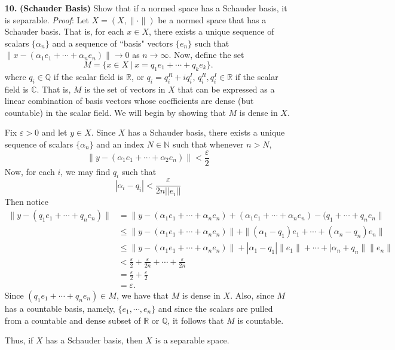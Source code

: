 \documentclass{article}
\newcommand{\say}[1]{``#1"}
\begin{document}
\begin{itemize}
    \item[\textbf{10.}] \textbf{(Schauder Basis)} Show that if a normed space has a Schauder basis, it is separable.
    \newline\newline
    \textit{Proof}: Let $X = (X, \|\cdot\|)$ be a normed space that has a Schauder basis. That is, for each $x \in X$, there exists a unique sequence of scalars $\{\alpha_n\}$ and a sequence of \say{basis} vectors $\{e_n\}$ such that $\|x - (\alpha_1e_1 + \cdots + \alpha_ne_n)\| \to 0$ as $n \to \infty$. Now, define the set
    \[M = \{x \in X \: | \: x = q_1e_1 + \cdots + q_ke_k\}.\]
    where $q_i \in \mathbb{Q}$ if the scalar field is $\mathbb{R}$, or $q_i  = q_i^R + iq_i^I$, $q_i^R, q_i^I \in \mathbb{R}$ if the scalar field is $\mathbb{C}$.
    That is, $M$ is the set of vectors in $X$ that can be expressed as a linear combination of basis vectors whose coefficients are dense (but countable) in the scalar field. We will begin by showing that $M$ is dense in $X$. 
    
    Fix $\varepsilon > 0$ and let $y \in X$. Since $X$ has a Schauder basis, there exists a unique sequence of scalars $\{\alpha_n\}$ and an index $N \in \mathbb{N}$ such that whenever $n > N$, 
    \[\|y - (\alpha_1e_1 + \cdots + \alpha_2e_n)\| < \frac{\varepsilon}{2}\]
    Now, for each $i$, we may find $q_i$ such that 
    \[|\alpha_i - q_i| < \frac{\varepsilon}{2n||e_i||}\]
    Then notice
    \begin{align*}
        \|y - (q_1e_1 + \cdots + q_ne_n)\| &= \|y - (\alpha_1e_1 + \cdots + \alpha_ne_n) + (\alpha_1e_1 + \cdots + \alpha_ne_n) - (q_1 + \cdots + q_ne_n\|\\
        &\leq \|y - (\alpha_1e_1 + \cdots + \alpha_ne_n)\| + \|(\alpha_1 - q_1)e_1 + \cdots + (\alpha_n - q_n)e_n\|\\
        &\leq \|y - (\alpha_1e_1 + \cdots + \alpha_ne_n)\| + |\alpha_1 - q_1|\|e_1\| + \cdots + |\alpha_n + q_n\|\|e_n\|\\
        &< \frac{\varepsilon}{2} + \frac{\varepsilon}{2n} + \cdots + \frac{\varepsilon}{2n}\\
        &= \frac{\varepsilon}{2} + \frac{\varepsilon}{2}\\
        &= \varepsilon.
    \end{align*}
    Since $(q_1e_1 + \cdots + q_ne_n) \in M$, we have that $M$ is dense in $X$. Also, since $M$ has a countable basis, namely, $\{e_1, \cdots, e_n\}$ and since the scalars are pulled from a countable and dense subset of $\mathbb{R}$ or $\mathbb{Q}$, it follows that $M$ is countable.

    Thus, if $X$ has a Schauder basis, then $X$ is a separable space.
    
    
\end{itemize}
\end{document}
